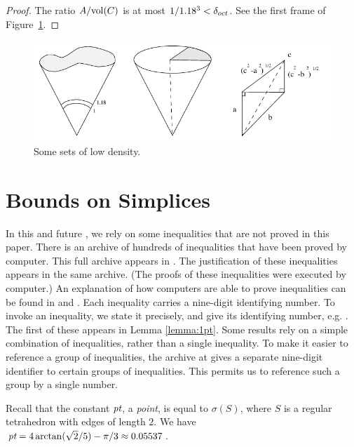 \begin{proof} The ratio $A/{\operatorname{vol}}(C)$ is at most $1/1.18^3 < \delta_{oct}$.   See the
first frame of Figure~\ref{fig:doct}.
\end{proof}

\begin{figure}[htb]
  \centering
  \includegraphics{PS/ha42.pdf}
  \caption{Some sets of low density.}
  \label{fig:doct}
\end{figure}

\section{Bounds on Simplices}\label{sec:bounds-simplex}

In this and future \chaps,
we rely on some inequalities that are not proved in
this paper.  There is an archive of hundreds of inequalities that
have been proved by computer.  This full archive appears in
\cite{web}.  The justification of these inequalities appears in
the same archive.  (The proofs of these inequalities were executed
by computer.)  An explanation of how computers are able to prove
inequalities can be found in \cite{algorithm} and \cite{part1}.
Each inequality carries a nine-digit identifying number. To invoke
an inequality, we state it precisely, and give its identifying
number, e.g. . The first of these appears in Lemma
\ref{lemma:1pt}.  Some results rely on a simple combination of
inequalities, rather than a single inequality.  To make it easier
to reference a group of inequalities, the archive at \cite{web}
gives a separate nine-digit identifier to certain groups of
inequalities.  This permits us to reference such a group by a
single number.
%


\begin{definition} \label{def:point}
Recall that the constant $\hbox{\it pt}$, a {\it point},  is equal to
$\sigma(S)$, where $S$ is a regular tetrahedron with edges of
length $2$. We have $\hbox{\it pt} = 4\arctan(\sqrt2/5) - \pi/3 \approx
0.05537$.
\end{definition}



